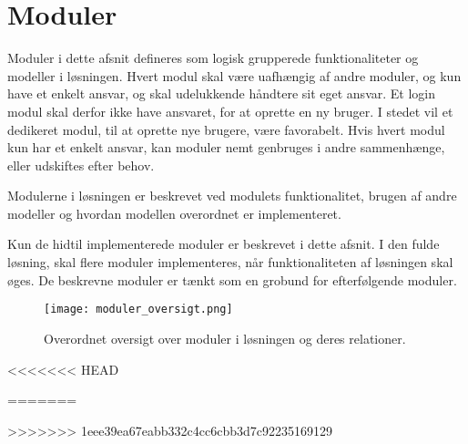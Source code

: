\section{Moduler}
\label{sec:moduler}

Moduler i dette afsnit defineres som logisk grupperede funktionaliteter og modeller i løsningen. Hvert modul skal være uafhængig af andre moduler, og kun have et enkelt ansvar, og skal udelukkende håndtere sit eget ansvar. Et login modul skal derfor ikke have ansvaret, for at oprette en ny bruger. I stedet vil et dedikeret modul, til at oprette nye brugere, være favorabelt. Hvis hvert modul kun har et enkelt ansvar, kan moduler nemt genbruges i andre sammenhænge, eller udskiftes efter behov.

Modulerne i løsningen er beskrevet ved modulets funktionalitet, brugen af andre modeller og hvordan modellen overordnet er implementeret.

Kun de hidtil implementerede moduler er beskrevet i dette afsnit. I den fulde løsning, skal flere moduler implementeres, når funktionaliteten af løsningen skal øges. De beskrevne moduler er tænkt som en grobund for efterfølgende moduler.

\begin{figure}
  \centering
  \texttt{[image: moduler\_oversigt.png]}
  \caption{Overordnet oversigt over moduler i løsningen og deres relationer.}
\end{figure}






<<<<<<< HEAD

=======

>>>>>>> 1eee39ea67eabb332c4cc6cbb3d7c92235169129
